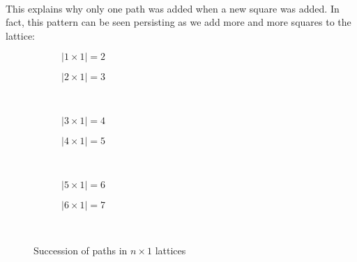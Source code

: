 \documentclass[12pt]{article}
\newcommand{\p}{\paragraph{}}
\begin{document}
			\p This explains why only one path was added when a new square was added. In fact, this pattern can be seen persisting as we add more and more squares to the lattice:
			
			\begin{figure}[h]
				\centering
				\captionsetup[subfigure]{justification=justified,singlelinecheck=false}
				
				\begin{subfigure}{.5\textwidth}
					
					\caption*{$|1\times1|=2$}
				\end{subfigure}\hfill%
				\begin{subfigure}{.5\textwidth}
					\caption*{$|2\times1|=3$}
				\end{subfigure}\\ \vspace{.5cm}%
				\begin{subfigure}{.5\textwidth}
					\caption*{$|3\times1|=4$}
				\end{subfigure}\hfill%
				\begin{subfigure}{.5\textwidth}
					\caption*{$|4\times1|=5$}
				\end{subfigure}\\ \vspace{.5cm}%
				\begin{subfigure}{.5\textwidth}
					\caption*{$|5\times1|=6$}
				\end{subfigure}\hfill%
				\begin{subfigure}{.5\textwidth}
					\caption*{$|6\times1|=7$}
				\end{subfigure}\\ \vspace{.5cm}
				
				\caption{Succession of paths in $n\times1$ lattices}
			\end{figure}
		
\end{document}

